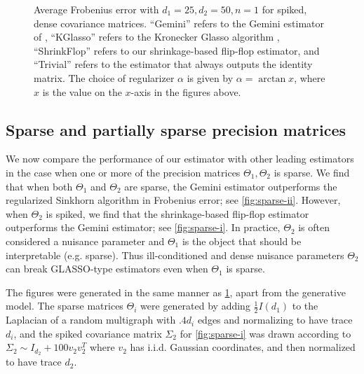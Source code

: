 \documentclass[aos]{imsart}
\theoremstyle{definition}
\numberwithin{equation}{section}
\begin{document}
\begin{figure}
\begin{subfigure}[b]{.4\textwidth}
          \end{subfigure}
\caption{Average Frobenius error with $d_1 = 25, d_2 = 50, n = 1$ for spiked, dense covariance matrices. ``Gemini'' refers to the Gemini estimator of \cite{zhou2014gemini}, ``KGlasso'' refers to the Kronecker Glasso algorithm \cite{tsiligkaridis2013convergence}, ``ShrinkFlop'' refers to our shrinkage-based flip-flop estimator, and ``Trivial'' refers to the estimator that always outputs the identity matrix. The choice of regularizer $\alpha$ is given by $\alpha = \arctan{x}$, where $x$ is the value on the $x$-axis in the figures above. }\label{fig:spiked}
\end{figure}

 
 \subsection{Sparse and partially sparse precision matrices} 

We now compare the performance of our estimator with other leading estimators in the case when one or more of the precision matrices $\Theta_1, \Theta_2$ is sparse. We find that when both $\Theta_1$ and $\Theta_2$ are sparse, the Gemini estimator outperforms the regularized Sinkhorn algorithm in Frobenius error; see \cref{fig:sparse-ii}. However, when $\Theta_2$ is spiked, we find that the shrinkage-based flip-flop estimator outperforms the Gemini estimator; see \cref{fig:sparse-i}. In practice, $\Theta_2$ is often considered a nuisance parameter and $\Theta_1$ is the object that should be interpretable (e.g. sparse). Thus ill-conditioned and dense nuisance parameters $\Theta_2$ can break GLASSO-type estimators even when $\Theta_1$ is sparse.

The figures were generated in the same manner as \cref{fig:spiked}, apart from the generative model. The sparse matrices $\Theta_i$ were generated by adding $\frac{1}{2}I(d_1)$ to the Laplacian of a random multigraph with $.4 d_i$ edges and normalizing to have trace $d_i$, and the spiked covariance matrix $\Sigma_2$ for \cref{fig:sparse-i} was drawn according to $\Sigma_2 \sim I_{d_2} + 100 v_2v_2^T$ where $v_2$ has i.i.d. Gaussian coordinates, and then normalized to have trace $d_2$.
\end{document}
